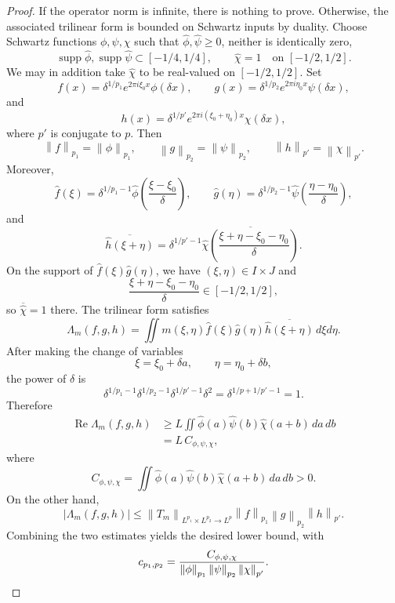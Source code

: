 \documentclass[11pt]{amsart}
\theoremstyle{remark}
\numberwithin{equation}{section}
\newcommand{\norm}[1]{\left\lVert #1\right\rVert}
\begin{document}
	\begin{proof}
		If the operator norm is infinite, there is nothing to prove.  Otherwise, the
		associated trilinear form is bounded on Schwartz inputs by duality.  Choose
		Schwartz functions \(\phi,\psi,\chi\) such that
		\(\widehat\phi,\widehat\psi\ge0\), neither is identically zero,
		\[
		\operatorname{supp}\widehat\phi,
		\operatorname{supp}\widehat\psi
		\subset[-1/4,1/4],
		\qquad
		\widehat\chi=1
		\quad\text{on }[-1/2,1/2].
		\]
		We may in addition take \(\widehat\chi\) to be real-valued on
		\([-1/2,1/2]\).
		Set
		\[
		f(x)=\delta^{1/p_1}e^{2\pi i\xi_0x}\phi(\delta x),
		\qquad
		g(x)=\delta^{1/p_2}e^{2\pi i\eta_0x}\psi(\delta x),
		\]
		and
		\[
		h(x)=\delta^{1/p'}e^{2\pi i(\xi_0+\eta_0)x}\chi(\delta x),
		\]
		where \(p'\) is conjugate to \(p\).  Then
		\[
		\norm f_{p_1}=\norm\phi_{p_1},
		\qquad
		\norm g_{p_2}=\norm\psi_{p_2},
		\qquad
		\norm h_{p'}=\norm\chi_{p'}.
		\]
		Moreover,
		\[
		\widehat f(\xi)
		=
		\delta^{1/p_1-1}
		\widehat\phi\left(\frac{\xi-\xi_0}{\delta}\right),
		\qquad
		\widehat g(\eta)
		=
		\delta^{1/p_2-1}
		\widehat\psi\left(\frac{\eta-\eta_0}{\delta}\right),
		\]
		and
		\[
		\overline{\widehat h(\xi+\eta)}
		=
		\delta^{1/p'-1}
		\overline{\widehat\chi
			\left(\frac{\xi+\eta-\xi_0-\eta_0}{\delta}\right)} .
		\]
		On the support of \(\widehat f(\xi)\widehat g(\eta)\), we have
		\((\xi,\eta)\in I\times J\) and
		\[
		\frac{\xi+\eta-\xi_0-\eta_0}{\delta}\in[-1/2,1/2],
		\]
		so \(\overline{\widehat\chi}=1\) there.  The trilinear form satisfies
		\[
		\Lambda_m(f,g,h)
		=
		\iint m(\xi,\eta)
		\widehat f(\xi)\widehat g(\eta)
		\overline{\widehat h(\xi+\eta)}\,d\xi d\eta .
		\]
		After making the change of variables
		\[
		\xi=\xi_0+\delta a,
		\qquad
		\eta=\eta_0+\delta b,
		\]
		the power of \(\delta\) is
		\[
		\delta^{1/p_1-1}
		\delta^{1/p_2-1}
		\delta^{1/p'-1}
		\delta^2
		=
		\delta^{1/p+1/p'-1}
		=
		1.
		\]
		Therefore
		\[
		\begin{aligned}
			\operatorname{Re}\Lambda_m(f,g,h)
			&\ge
			L
			\iint
			\widehat\phi(a)\widehat\psi(b)\widehat\chi(a+b)\,da\,db  \\
			&=
			L\,C_{\phi,\psi,\chi},
		\end{aligned}
		\]
		where
		\[
		C_{\phi,\psi,\chi}
		=
		\iint
		\widehat\phi(a)\widehat\psi(b)\widehat\chi(a+b)\,da\,db
		>0.
		\]
		On the other hand,
		\[
		|\Lambda_m(f,g,h)|
		\le
		\norm{T_m}_{L^{p_1}\times L^{p_2}\to L^p}
		\norm f_{p_1}\norm g_{p_2}\norm h_{p'}.
		\]
		Combining the two estimates yields the desired lower bound, with
		\[
		c_{p_1,p_2}
		=
		\frac{C_{\phi,\psi,\chi}}
		{\norm\phi_{p_1}\norm\psi_{p_2}\norm\chi_{p'}}.
		\qedhere
		\]
	\end{proof}
	
\end{document}
